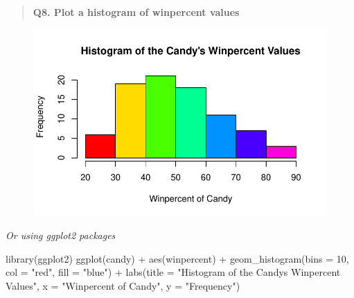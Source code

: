 \documentclass[
  letterpaper,
  DIV=11,
  numbers=noendperiod]{scrartcl}
\newenvironment{Shaded}{\begin{snugshade}}{\end{snugshade}}
\newcommand{\AttributeTok}[1]{\textcolor[rgb]{0.40,0.45,0.13}{#1}}
\newcommand{\DecValTok}[1]{\textcolor[rgb]{0.68,0.00,0.00}{#1}}
\newcommand{\FunctionTok}[1]{\textcolor[rgb]{0.28,0.35,0.67}{#1}}
\newcommand{\NormalTok}[1]{\textcolor[rgb]{0.00,0.23,0.31}{#1}}
\newcommand{\SpecialCharTok}[1]{\textcolor[rgb]{0.37,0.37,0.37}{#1}}
\newcommand{\StringTok}[1]{\textcolor[rgb]{0.13,0.47,0.30}{#1}}
\begin{document}
\begin{quote}
\textbf{Q8. Plot a histogram of winpercent values}
\end{quote}

\begin{Shaded}
\end{Shaded}

\begin{figure}[H]

{\centering \includegraphics{class10_files/figure-pdf/unnamed-chunk-9-1.pdf}

}

\end{figure}

\emph{Or using ggplot2 packages}

\begin{Shaded}
\begin{Highlighting}[]
\FunctionTok{library}\NormalTok{(ggplot2)}
\FunctionTok{ggplot}\NormalTok{(candy) }\SpecialCharTok{+}
  \FunctionTok{aes}\NormalTok{(winpercent) }\SpecialCharTok{+}
  \FunctionTok{geom\_histogram}\NormalTok{(}\AttributeTok{bins =} \DecValTok{10}\NormalTok{, }\AttributeTok{col =} \StringTok{"red"}\NormalTok{, }\AttributeTok{fill =} \StringTok{"blue"}\NormalTok{) }\SpecialCharTok{+}
  \FunctionTok{labs}\NormalTok{(}\AttributeTok{title =} \StringTok{"Histogram of the Candy\textquotesingle{}s Winpercent Values"}\NormalTok{, }
       \AttributeTok{x =} \StringTok{"Winpercent of Candy"}\NormalTok{, }\AttributeTok{y =} \StringTok{"Frequency"}\NormalTok{)}
\end{Highlighting}
\end{Shaded}
\end{document}
